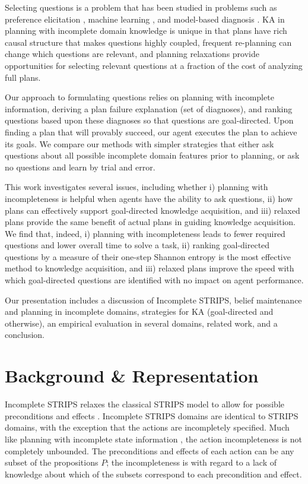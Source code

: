 \documentclass{article}
\def\citep#1{\cite{#1}}
\begin{document}
Selecting questions is a problem that has been studied in problems such as
preference elicitation \citep{DBLP:conf/aaai/Boutilier02}, machine learning
\citep{AICPub1812:2011}, and model-based diagnosis
\citep{deKleer:1992:CDS:140524.140531}.  KA in planning with
incomplete domain knowledge is unique in that plans have rich causal structure
that makes questions highly coupled, frequent re-planning can change which
questions are relevant, and planning relaxations provide opportunities for
selecting relevant questions at a fraction of the cost of analyzing full plans.  

Our approach to formulating questions relies on planning with incomplete
information, deriving a plan failure explanation (set of diagnoses), and ranking
questions based upon these diagnoses so that questions are goal-directed.  Upon
finding a plan that will provably succeed, our agent executes the plan to
achieve its goals.  We compare our methods with simpler strategies that either
ask questions about all possible incomplete domain features prior to planning, or ask no questions and
learn by trial and error.

This work investigates several issues, including whether i)
planning with incompleteness is helpful when agents have the ability to ask questions, ii) how
plans can effectively support goal-directed knowledge acquisition, and iii)
relaxed plans provide the same benefit of actual plans in guiding knowledge
acquisition.  We find that, indeed, i) planning with incompleteness leads to
fewer required questions and lower overall time to solve a task, ii) ranking
goal-directed questions by a measure of their one-step Shannon entropy is the
most effective method to knowledge acquisition, and iii) relaxed plans improve
the speed with which goal-directed questions are identified with no
impact on agent performance.

Our presentation includes a discussion of Incomplete STRIPS, belief maintenance
and planning in incomplete domains, strategies for KA
(goal-directed and otherwise), an empirical evaluation in several domains,
related work, and a conclusion.

\section{Background \& Representation}\label{sec:background}

Incomplete STRIPS relaxes the classical STRIPS model to allow for
possible preconditions and effects \citep{Garland02}.  
Incomplete STRIPS domains are identical to STRIPS domains, with the exception
that the actions are incompletely specified.  Much like planning with incomplete
state information \citep{bonet00planning}, the action incompleteness is not
completely unbounded.  The preconditions and effects of each action can be any
subset of the propositions $P$; the incompleteness is with regard to a lack of
knowledge about which of the subsets correspond to each precondition and effect.        
\end{document}
